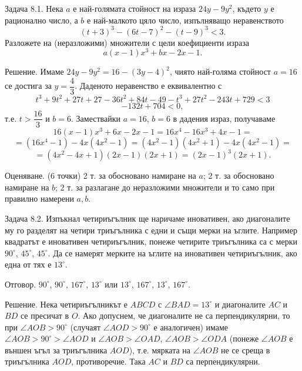 
Задача 8.1. Нека $a$ е най-голямата стойност на израза $24y-9y^2$, където $y$ е рационално число, а $b$ е най-малкото цяло число, изпълняващо неравенството
$$
(t+3)^3-(6t-7)^2-(t-9)^3<3.
$$
Разложете на (неразложими) множители с цели коефициенти израза
$$
a(x-1)x^3+bx-2x-1.
$$

Решение. Имаме $24y-9y^2=16-(3y-4)^2$, чиято най-голяма стойност $a=16$ се достига за $y=\dfrac43$. Даденото неравенство е еквивалентно с
$$
t^3+9t^2+27t+27-36t^2+84t-49-t^3+27t^2-243t+729<3
$$
$$
-132t+704<0,
$$
т.е. $t>\dfrac{16}{3}$ и $b=6$. Замествайки $a=16$, $b=6$ в дадения израз, получаваме
$$
16(x-1)x^3+6x-2x-1=16x^4-16x^3+4x-1=
$$
$$
=(16x^4-1)-4x(4x^2-1)=(4x^2-1)(4x^2+1)-4x(4x^2-1)=
$$
$$
=(4x^2-4x+1)(2x-1)(2x+1)=(2x-1)^3(2x+1).
$$

Оценяване. (6 точки) 2 т. за обосновано намиране на $a$; 2 т. за обосновано намиране на $b$; 2 т. за разлагане до неразложими множители и то само при правилно намерени $a,b$.

Задача 8.2. Изпъкнал четириъгълник ще наричаме иновативен, ако диагоналите му го разделят на четири триъгълника с едни и същи мерки на ъглите. Например квадратът е иновативен четириъгълник, понеже четирите триъгълника са с мерки $90^\circ$, $45^\circ$, $45^\circ$. Да се намерят мерките на ъглите на иновативен четириъгълник, ако една от тях е $13^\circ$.

Отговор. $90^\circ$, $90^\circ$, $167^\circ$, $13^\circ$ или $13^\circ$, $167^\circ$, $13^\circ$, $167^\circ$.

Решение. Нека четириъгълникът е $ABCD$ с $\angle BAD=13^\circ$ и диагоналите $AC$ и $BD$ се пресичат в $O$. Ако допуснем, че диагоналите не са перпендикулярни, то при $\angle AOB>90^\circ$ (случаят $\angle AOD>90^\circ$ е аналогичен) имаме $\angle AOB>90^\circ>\angle AOD$ и $\angle AOB>\angle OAD$, $\angle AOB>\angle ODA$ (понеже $\angle AOB$ е външен ъгъл за триъгълника $AOD$), т.е. мярката на $\angle AOB$ не се среща в триъгълника $AOD$, противоречие. Така $AC$ и $BD$ са перпендикулярни.

